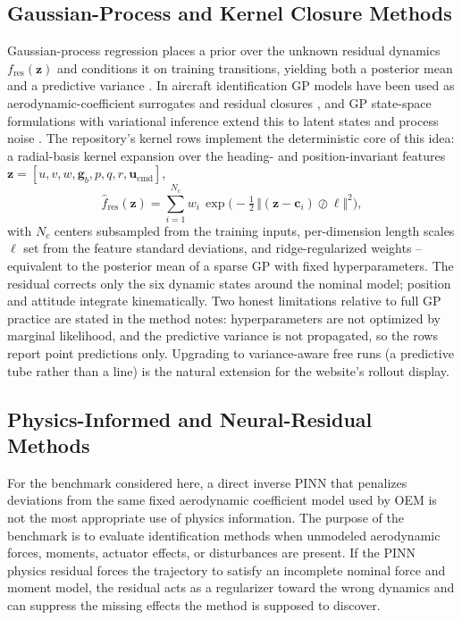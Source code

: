 \documentclass[11pt]{article}
\begin{document}
\subsection{Gaussian-Process and Kernel Closure Methods}
Gaussian-process regression places a prior over the unknown residual
dynamics $f_{\mathrm{res}}(\mathbf{z})$ and conditions it on training
transitions, yielding both a posterior mean and a predictive variance
\cite{rasmussen2006gaussian}. In aircraft identification GP models have been
used as aerodynamic-coefficient surrogates and residual closures
\cite{hemakumara2013learning}, and GP state-space formulations with
variational inference extend this to latent states and process noise
\cite{frigola2014variational,doerr2018probabilistic}. The repository's
kernel rows implement the deterministic core of this idea: a radial-basis
kernel expansion over the heading- and position-invariant features
$\mathbf{z} = [u, v, w, \mathbf{g}_b, p, q, r, \mathbf{u}_{\mathrm{cmd}}]$,
\[
\hat f_{\mathrm{res}}(\mathbf{z}) = \sum_{i=1}^{N_c} w_i\,
\exp\!\Big(-\tfrac{1}{2}\,\big\Vert (\mathbf{z}-\mathbf{c}_i) \oslash
\boldsymbol{\ell} \big\Vert^2\Big),
\]
with $N_c$ centers subsampled from the training inputs, per-dimension length
scales $\boldsymbol{\ell}$ set from the feature standard deviations, and
ridge-regularized weights -- equivalent to the posterior mean of a sparse GP
with fixed hyperparameters. The residual corrects only the six dynamic
states around the nominal model; position and attitude integrate
kinematically. Two honest limitations relative to full GP practice are
stated in the method notes: hyperparameters are not optimized by marginal
likelihood, and the predictive variance is not propagated, so the rows
report point predictions only. Upgrading to variance-aware free runs (a
predictive tube rather than a line) is the natural extension for the
website's rollout display.

\subsection{Physics-Informed and Neural-Residual Methods}
For the benchmark considered here, a direct inverse PINN that penalizes deviations from the same fixed aerodynamic coefficient model used by OEM is not the most appropriate use of physics information. The purpose of the benchmark is to evaluate identification methods when unmodeled aerodynamic forces, moments, actuator effects, or disturbances are present. If the PINN physics residual forces the trajectory to satisfy an incomplete nominal force and moment model, the residual acts as a regularizer toward the wrong dynamics and can suppress the missing effects the method is supposed to discover.
\end{document}
